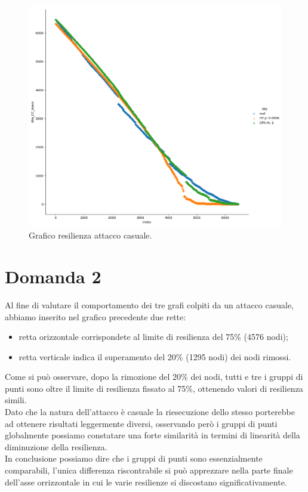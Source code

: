\documentclass{article}
\begin{document}
\begin{landscape}
	\begin{figure}
		\centering
		\includegraphics[width=1.3\textwidth]{figures/figure_random}
		\caption{Grafico resilienza attacco casuale.}
	\end{figure}
\end{landscape}

\newpage
\section*{Domanda 2}
Al fine di valutare il comportamento dei tre grafi colpiti da un attacco casuale, abbiamo inserito nel grafico precedente due rette:
\begin{itemize}
	\item retta orizzontale corrispondete al limite di resilienza del 75\% (4576 nodi);
	\item retta verticale indica il superamento del 20\% (1295 nodi) dei nodi rimossi. 
\end{itemize}
Come si può osservare, dopo la rimozione del 20\% dei nodi, tutti e tre i gruppi di punti sono oltre il limite di resilienza fissato al 75\%, ottenendo valori di resilienza simili.\\
Dato che la natura dell'attacco è casuale la riesecuzione dello stesso porterebbe ad ottenere risultati leggermente diversi, osservando però i gruppi di punti globalmente possiamo constatare una forte similarità in termini di linearità della diminuzione della resilienza.\\
In conclusione possiamo dire che i gruppi di punti sono essenzialmente comparabili, l'unica differenza riscontrabile si può apprezzare nella parte finale dell'asse orrizzontale in cui le varie resilienze si discostano significativamente.
\end{document}

